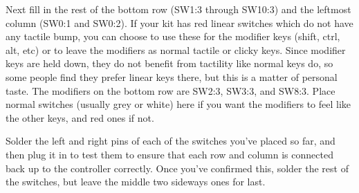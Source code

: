 \documentclass{article}
\begin{document}
\vspace{1em}
\noindent{}
\vspace{1em}

Next fill in the rest of the bottom row (SW1:3 through SW10:3) and the
leftmost column (SW0:1 and SW0:2). If your kit has red linear switches
which do not have any tactile bump, you can choose to use these for
the modifier keys (shift, ctrl, alt, etc) or to leave the modifiers as
normal tactile or clicky keys. Since modifier keys are held down, they
do not benefit from tactility like normal keys do, so some people find
they prefer linear keys there, but this is a matter of personal
taste. The modifiers on the bottom row are SW2:3, SW3:3, and SW8:3.
Place normal switches (usually grey or white) here if you want the
modifiers to feel like the other keys, and red ones if not.

\vspace{1em}

Solder the left and right pins of each of the switches you've placed so
far, and then plug it in to test them to ensure that each row and column is
connected back up to the controller correctly. Once you've confirmed
this, solder the rest of the switches, but leave the middle two
sideways ones for last.

\vspace{1em}
\noindent{}
\vspace{1em}

\vspace{1em}

\end{document}
